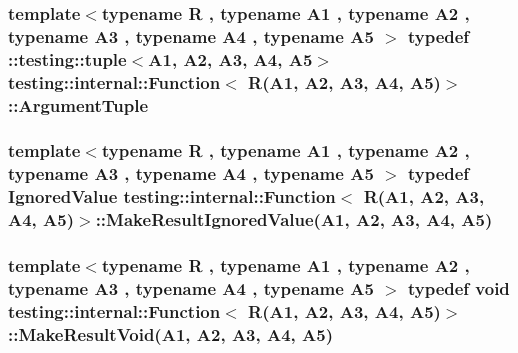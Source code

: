 \subsubsection[{\texorpdfstring{Argument\+Tuple}{ArgumentTuple}}]{\setlength{\rightskip}{0pt plus 5cm}template$<$typename R , typename A1 , typename A2 , typename A3 , typename A4 , typename A5 $>$ typedef \+::testing\+::tuple$<$A1, A2, A3, A4, A5$>$ {\bf testing\+::internal\+::\+Function}$<$ R(A1, A2, A3, A4, A5)$>$\+::{\bf Argument\+Tuple}}\hypertarget{structtesting_1_1internal_1_1_function_3_01_r_07_a1_00_01_a2_00_01_a3_00_01_a4_00_01_a5_08_4_af5a1487829347eae2a48b2f66f216f52}{}\label{structtesting_1_1internal_1_1_function_3_01_r_07_a1_00_01_a2_00_01_a3_00_01_a4_00_01_a5_08_4_af5a1487829347eae2a48b2f66f216f52}
\subsubsection[{\texorpdfstring{Make\+Result\+Ignored\+Value}{MakeResultIgnoredValue}}]{\setlength{\rightskip}{0pt plus 5cm}template$<$typename R , typename A1 , typename A2 , typename A3 , typename A4 , typename A5 $>$ typedef {\bf Ignored\+Value} {\bf testing\+::internal\+::\+Function}$<$ R(A1, A2, A3, A4, A5)$>$\+::Make\+Result\+Ignored\+Value(A1, A2, A3, A4, A5)}\hypertarget{structtesting_1_1internal_1_1_function_3_01_r_07_a1_00_01_a2_00_01_a3_00_01_a4_00_01_a5_08_4_a552ce4ec27e2d09fa1c133c66f72d7b3}{}\label{structtesting_1_1internal_1_1_function_3_01_r_07_a1_00_01_a2_00_01_a3_00_01_a4_00_01_a5_08_4_a552ce4ec27e2d09fa1c133c66f72d7b3}
\subsubsection[{\texorpdfstring{Make\+Result\+Void}{MakeResultVoid}}]{\setlength{\rightskip}{0pt plus 5cm}template$<$typename R , typename A1 , typename A2 , typename A3 , typename A4 , typename A5 $>$ typedef void {\bf testing\+::internal\+::\+Function}$<$ R(A1, A2, A3, A4, A5)$>$\+::Make\+Result\+Void(A1, A2, A3, A4, A5)}\hypertarget{structtesting_1_1internal_1_1_function_3_01_r_07_a1_00_01_a2_00_01_a3_00_01_a4_00_01_a5_08_4_a2903acde18de33d756eef4d43d843c04}{}\label{structtesting_1_1internal_1_1_function_3_01_r_07_a1_00_01_a2_00_01_a3_00_01_a4_00_01_a5_08_4_a2903acde18de33d756eef4d43d843c04}


